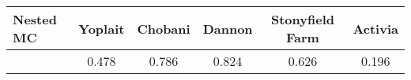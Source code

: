 \begin{tabular}{lccccc}
\hline
Nested MC & Yoplait & Chobani & Dannon & Stonyfield Farm & Activia \\
\hline
& 0.478 & 0.786 & 0.824 & 0.626 & 0.196 \\
\hline
\end{tabular}